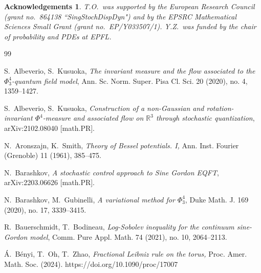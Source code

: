 \documentclass[letterpaper, 11pt,  reqno]{amsart}
\theoremstyle{myremark}
\newtheorem*{ackno}{Acknowledgements}
\newcommand{\1}{\hspace{0.5mm}\text{I}\hspace{0.5mm}}
\newcommand{\R}{\mathbb{R}}
\numberwithin{equation}{section}
\numberwithin{theorem}{section}
\begin{document}
\begin{ackno}
T.O.\ was supported by the European Research Council (grant no.~864138 ``SingStochDispDyn")
and  by the EPSRC 
Mathematical Sciences
Small Grant  (grant no.~EP/Y033507/1).
Y.Z.~was   funded by the chair of probability and PDEs at EPFL. 
\end{ackno}






\begin{thebibliography}{99}


S.~Albeverio, S.~Kusuoka,
{\it The invariant measure and the flow associated to the $\Phi^4_3$-quantum field model},
Ann. Sc. Norm. Super. Pisa Cl. Sci.  20 (2020), no. 4, 1359--1427.

S.~Albeverio, S.~Kusuoka,
{\it Construction of a non-Gaussian and rotation-invariant $\Phi^4$-measure and associated flow on $\R^3$ through stochastic quantization},
arXiv:2102.08040 [math.PR].

N.~Aronszajn, K.~Smith, 
{\it Theory of Bessel potentials. I,}
 Ann. Inst. Fourier (Grenoble) 11 (1961),  385--475. 









N.~Barashkov,
{\it 
A stochastic control approach to Sine Gordon EQFT}, 
arXiv:2203.06626 [math.PR].


N.~Barashkov, M.~Gubinelli, 
{\it  A variational method for $\Phi^4_3$}, 
Duke Math. J.
 169 (2020), no. 17, 3339--3415.
%



R.~Bauerschmidt, T.~Bodineau, 
{\it Log-Sobolev inequality for the continuum sine-Gordon model},
 Comm. Pure Appl. Math. 74 (2021), no. 10, 2064--2113. 

\'A.~B\'enyi, T.~Oh, T.~Zhao,
{\it Fractional Leibniz rule on the torus,}
Proc. Amer. Math. Soc.
 (2024). https://doi.org/10.1090/proc/17007 



\end{thebibliography}
\end{document}
